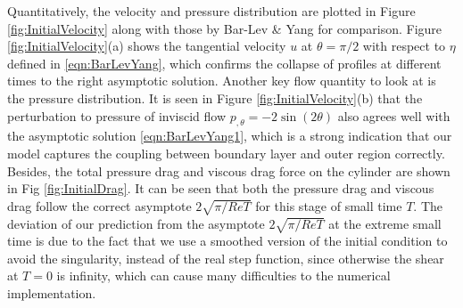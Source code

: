 Quantitatively, the velocity and pressure distribution are plotted in Figure \ref{fig:InitialVelocity} along with those by Bar-Lev \& Yang for comparison.
Figure \ref{fig:InitialVelocity}(a) shows the tangential velocity $u$ at $\theta = \pi/2$ with respect to $\eta$ defined in \ref{eqn:BarLevYang}, which confirms the collapse of profiles at different times to the right asymptotic solution.
Another key flow quantity to look at is the pressure distribution.
It is seen in Figure \ref{fig:InitialVelocity}(b) that the perturbation to pressure of inviscid flow $p_{, \theta} = -2 \sin(2 \theta)$ also agrees well with the asymptotic solution \eqref{eqn:BarLevYang1}, which is a strong indication that our model captures the coupling between boundary layer and outer region correctly.
Besides, the total pressure drag and viscous drag force on the cylinder are shown in Fig \ref{fig:InitialDrag}.
It can be seen that both the pressure drag and viscous drag follow the correct asymptote $2\sqrt{\pi/ReT}$ for this stage of small time $T$.
The deviation of our prediction from the asymptote $2\sqrt{\pi/ReT}$ at the extreme small time is due to the fact that we use a smoothed version of the initial condition to avoid the singularity, instead of the real step function, since otherwise the shear at $T = 0$ is infinity, which can cause many difficulties to the numerical implementation.

